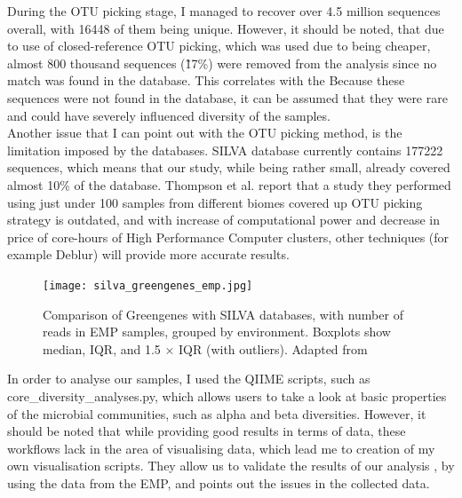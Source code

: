 \documentclass[twoside,twocolumn]{article}
\begin{document}
During the OTU picking stage, I managed to recover over 4.5 million sequences overall, with 16448 of them being unique. However, it should be noted, that due to use of closed-reference OTU picking, which was used due to being cheaper, almost 800 thousand sequences (\~17\%) were removed from the analysis since no match was found in the database. This correlates with the  Because these sequences were not found in the database, it can be assumed that they were rare and could have severely influenced diversity of the samples.\\
%
Another issue that I can point out with the OTU picking method, is the limitation imposed by the databases. SILVA database currently contains 177222 sequences, which means that our study, while being rather small, already covered almost 10\% of the database. Thompson et al.\cite{Thompson2017} report that a study they performed using just under 100 samples from different biomes covered up OTU picking strategy is outdated, and with increase of computational power and decrease in price of core-hours of High Performance Computer clusters, other techniques (for example Deblur\cite{Amir}) will provide more accurate results. \\

\begin{figure}
	\texttt{[image: silva\_greengenes\_emp.jpg]}
	\caption{Comparison of Greengenes with SILVA databases, with number of reads in EMP samples, grouped by environment. Boxplots show median, IQR, and 1.5 × IQR (with outliers). Adapted from \cite{Thompson2017}}
	\label{fig:EMP_Silva}
\end{figure}

In order to analyse our samples, I used the QIIME scripts, such as core\_diversity\_analyses.py, which allows users to take a look at basic properties of the microbial communities, such as alpha and beta diversities. However, it should be noted that while providing good results in terms of data, these workflows lack in the area of visualising data, which lead me to creation of my own visualisation scripts\cite{Senatorov2018}. They allow us to validate the results of our analysis , by using the data from the EMP, and points out the issues in the collected data.
\end{document}
